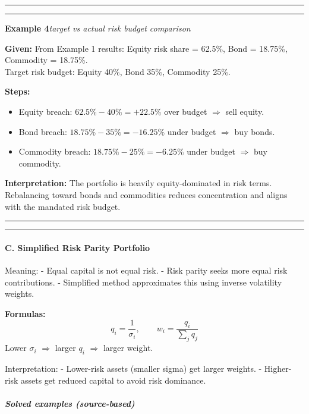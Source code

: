 \documentclass[
]{article}
\begin{document}
\noindent\rule{\linewidth}{0.4pt}
\medskip
\noindent\rule{\linewidth}{0.4pt}
\noindent\textbf{Example 4}\enspace\textit{target vs actual risk budget comparison}

\noindent\textbf{Given:} From Example 1 results: Equity risk share = 62.5\%, Bond = 18.75\%, Commodity = 18.75\%.\\
Target risk budget: Equity 40\%, Bond 35\%, Commodity 25\%.

\noindent\textbf{Steps:}
\begin{itemize}\setlength{\itemsep}{3pt}
  \item Equity breach: $62.5\% - 40\% = +22.5\%$ over budget $\Rightarrow$ sell equity.
  \item Bond breach: $18.75\% - 35\% = -16.25\%$ under budget $\Rightarrow$ buy bonds.
  \item Commodity breach: $18.75\% - 25\% = -6.25\%$ under budget $\Rightarrow$ buy commodity.
\end{itemize}

\noindent\textbf{Interpretation:} The portfolio is heavily equity-dominated in risk terms. Rebalancing toward bonds and commodities reduces concentration and aligns with the mandated risk budget.

\noindent\rule{\linewidth}{0.4pt}
\medskip

\begin{center}\rule{0.5\linewidth}{0.5pt}\end{center}

\hypertarget{c.-simplified-risk-parity-portfolio}{%
\paragraph{C. Simplified Risk Parity
Portfolio}\label{c.-simplified-risk-parity-portfolio}}

Meaning: - Equal capital is not equal risk. - Risk parity seeks more
equal risk contributions. - Simplified method approximates this using
inverse volatility weights.

\textbf{Formulas:}
\[
q_i = \frac{1}{\sigma_i}, \qquad w_i = \frac{q_i}{\sum_j q_j}
\]
Lower $\sigma_i$ $\Rightarrow$ larger $q_i$ $\Rightarrow$ larger weight.

Interpretation: - Lower-risk assets (smaller sigma) get larger weights.
- Higher-risk assets get reduced capital to avoid risk dominance.

\hypertarget{solved-examples-source-based-2}{%
\subparagraph{Solved examples
(source-based)}\label{solved-examples-source-based-2}}
\end{document}
